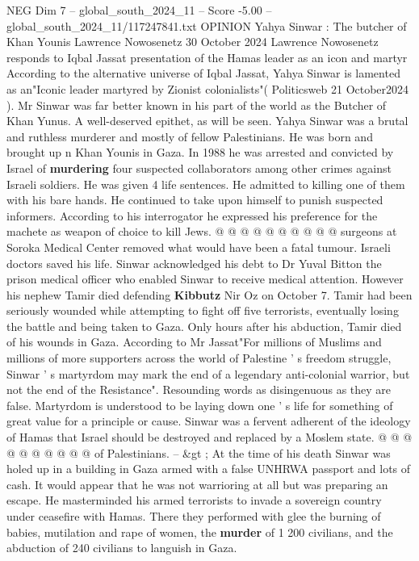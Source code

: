 \begin{textsample}{NEG Dim 7 – global\_south\_2024\_11 – Score -5.00 – global\_south\_2024\_11/117247841.txt}  \label{ex:f7_neg_434}
OPINION Yahya Sinwar : The butcher of Khan Younis Lawrence Nowosenetz 30 October 2024 Lawrence Nowosenetz responds to Iqbal Jassat presentation of the Hamas leader as an icon and martyr According to the alternative universe of Iqbal Jassat, Yahya Sinwar is lamented as an"Iconic leader martyred by Zionist colonialists"( Politicsweb 21 October2024 ).
Mr Sinwar was far better known in his part of the world as the Butcher of Khan Yunus.
A well-deserved epithet, as will be seen.
Yahya Sinwar was a brutal and ruthless murderer and mostly of fellow Palestinians.
He was born and brought up n Khan Younis in Gaza.
In 1988 he was arrested and convicted by Israel of \textbf{murdering} four suspected collaborators among other crimes against Israeli soldiers.
He was given 4 life sentences.
He admitted to killing one of them with his bare hands.
He continued to take upon himself to punish suspected informers.
According to his interrogator he expressed his preference for the machete as weapon of choice to kill Jews. @ @ @ @ @ @ @ @ @ @ surgeons at Soroka Medical Center removed what would have been a fatal tumour.
Israeli doctors saved his life.
Sinwar acknowledged his debt to Dr Yuval Bitton the prison medical officer who enabled Sinwar to receive medical attention.
However his nephew Tamir died defending \textbf{Kibbutz} Nir Oz on October 7.
Tamir had been seriously wounded while attempting to fight off five terrorists, eventually losing the battle and being taken to Gaza.
Only hours after his abduction, Tamir died of his wounds in Gaza.
According to Mr Jassat"For millions of Muslims and millions of more supporters across the world of Palestine ' s freedom struggle, Sinwar ' s martyrdom may mark the end of a legendary anti-colonial warrior, but not the end of the Resistance".
Resounding words as disingenuous as they are false.
Martyrdom is understood to be laying down one ' s life for something of great value for a principle or cause.
Sinwar was a fervent adherent of the ideology of Hamas that Israel should be destroyed and replaced by a Moslem state. @ @ @ @ @ @ @ @ @ @ of Palestinians. -- \&gt ; At the time of his death Sinwar was holed up in a building in Gaza armed with a false UNHRWA passport and lots of cash.
It would appear that he was not warrioring at all but was preparing an escape.
He masterminded his armed terrorists to invade a sovereign country under ceasefire with Hamas.
There they performed with glee the burning of babies, mutilation and rape of women, the \textbf{murder} of 1 200 civilians, and the abduction of 240 civilians to languish in Gaza.

\end{textsample}
